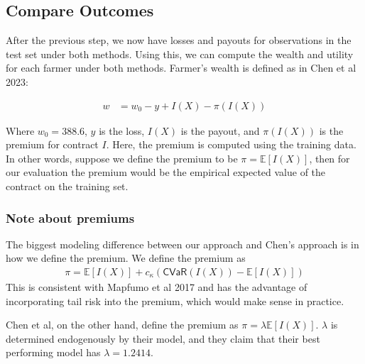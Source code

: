 \documentclass[11pt]{article}
\begin{document}
  \subsection{Compare Outcomes}
    After the previous step, we now have losses and payouts for observations in the test set under both methods. Using this, we can compute the wealth and utility for each farmer under both methods. Farmer's wealth is defined as in Chen et al 2023: 

    \begin{align}
        w &= w_0 -y + I(X) - \pi(I(X))
    \end{align}

    Where $w_0 = 388.6$, $y$ is the loss, $I(X)$ is the payout, and $\pi(I(X))$ is the premium for contract $I$. Here, the premium is computed using the training data. In other words, suppose we define the premium to be $\pi = \mathbb{E}[I(X)]$, then for our evaluation the premium would be the empirical expected value of the contract on the training set. 

    \subsubsection{Note about premiums}
      The biggest modeling difference between our approach and Chen's approach is in how we define the premium. We define the premium as 
      \begin{align}
        \pi = \mathbb{E}[I(X)] + c_{\kappa}\left ( \textsf{CVaR}(I(X)) - \mathbb{E}[I(X)]\right )
      \end{align}
      This is consistent with Mapfumo et al 2017 and has the advantage of incorporating tail risk into the premium, which would make sense in practice. 
      
      Chen et al, on the other hand, define the premium as $\pi = \lambda \mathbb{E}[I(X)]$. $\lambda$ is determined endogenously by their model, and they claim that their best performing model has $\lambda = 1.2414$. 
\end{document}
